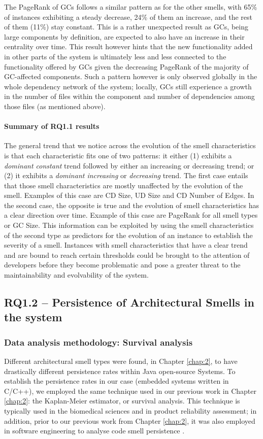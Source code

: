 The PageRank of GCs follows a similar pattern as for the other smells, with 65\% of instances exhibiting a steady decrease, 24\% of them an increase, and the rest of them (11\%) stay constant.
This is a rather unexpected result as GCs, being large components by definition, are expected to also have an increase in their centrality over time.
This result however hints that the new functionality added in other parts of the system is ultimately less and less connected to the functionality offered by GCs given the decreasing PageRank of the majority of GC-affected components.
Such a pattern however is only observed globally in the whole dependency network of the system; locally, GCs still experience a growth in the number of files within the component and number of dependencies among those files (as mentioned above).

\paragraph{Summary of RQ1.1 results}
The general trend that we notice across the evolution of the smell characteristics is that each characteristic fits one of two patterns: it either (1) exhibits a \emph{dominant constant} trend followed by either an increasing or decreasing trend; or (2) it exhibits a \emph{dominant increasing} or \emph{decreasing} trend. 
The first case entails that those smell characteristics are mostly unaffected by the evolution of the smell. Examples of this case are CD Size, UD Size and CD Number of Edges.
In the second case, the opposite is true and the evolution of smell characteristics has a clear direction over time. Example of this case are PageRank for all smell types or GC Size.
This information can be exploited by using the smell characteristics of the second type as predictors for the evolution of an instance to establish the severity of a smell.
Instances with smell characteristics that have a clear trend and are bound to reach certain thresholds could be brought to the attention of developers before they become problematic and pose a greater threat to the maintainability and evolvability of the system.

\subsection{RQ1.2 -- Persistence of Architectural Smells in the system}
\subsubsection{Data analysis methodology: Survival analysis}
Different architectural smell types were found, in Chapter \ref{chap:2}, to have drastically different persistence rates within Java open-source Systems.
To establish the persistence rates in our case (embedded systems written in C/C++), we employed the same technique used in our previous work in Chapter \ref{chap:2}: the Kaplan-Meier estimator, or survival analysis.
This technique is typically used in the biomedical sciences and in product reliability assessment; in addition, prior to our previous work from Chapter \ref{chap:2}, it was also employed in software engineering to analyse code smell persistence \cite{Chatzigeorgiou2014}.

